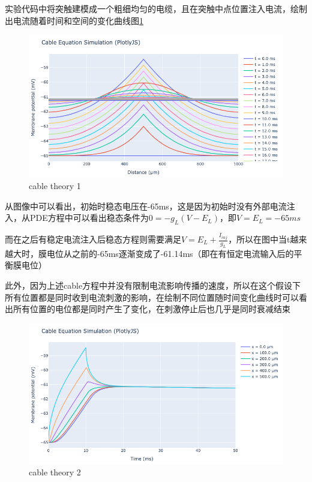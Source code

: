 \documentclass[nols, a4paper]{tufte-handout}
\begin{document}
实验代码中将突触建模成一个粗细均匀的电缆，且在突触中点位置注入电流，绘制出电流随着时间和空间的变化曲线图\ref{cable theory}
\begin{figure}
  \includegraphics[width=\linewidth]{image/cable1.png} 
  \caption{cable theory 1}
  \label{cable theory}
\end{figure}

从图像中可以看出，初始时稳态电压在-65ms，这是因为初始时没有外部电流注入，从PDE方程中可以看出稳态条件为$0 = -g_L (V - E_L)$，即$V = E_L = -65ms$

而在之后有稳定电流注入后稳态方程则需要满足$V = E_L + \frac{I_{inj}}{g_L}$，所以在图中当t越来越大时，膜电位从之前的-65ms逐渐变成了-61.14ms（即在有恒定电流输入后的平衡膜电位）

此外，因为上述cable方程中并没有限制电流影响传播的速度，所以在这个假设下所有位置都是同时收到电流刺激的影响，在绘制不同位置随时间变化曲线时可以看出所有位置的电位都是同时产生了变化，在刺激停止后也几乎是同时衰减结束
\begin{figure}
  \includegraphics[width=\linewidth]{image/cable2.png} 
  \caption{cable theory 2}
  \label{cable}
\end{figure}
\end{document}
